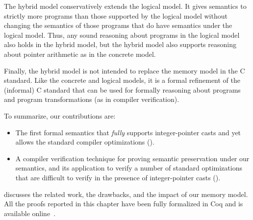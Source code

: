 The hybrid model conservatively extends the logical model.  It
gives semantics to strictly more programs than those supported by the
logical model without changing the semantics of those programs that do
have semantics under the logical model. Thus, any sound reasoning
about programs in the logical model also holds in the hybrid
model, but the hybrid model also supports reasoning about
pointer arithmetic as in the concrete model.

Finally, the hybrid model is not intended to replace the
memory model in the C standard. Like the concrete and logical models,
it is a formal refinement of the (informal) C standard that can be
used for formally reasoning about programs and program transformations
(as in compiler verification).

\medskip \noindent
To summarize, our contributions are:
\begin{itemize}
\item The first formal semantics that \emph{fully} supports integer-pointer casts and yet allows the
  standard compiler optimizations ().

\item A compiler verification technique for proving semantic preservation under our semantics, and its
  application to verify a number of standard optimizations that are difficult to verify in the
  presence of integer-pointer casts ().
\end{itemize}

\noindent {} discusses the related work, the drawbacks, and the impact
of our memory model.  All the proofs reported in this chapter have been fully formalized in Coq and
is available online~\cite{kang-phd-thesis-web}.

%
%
%
%


